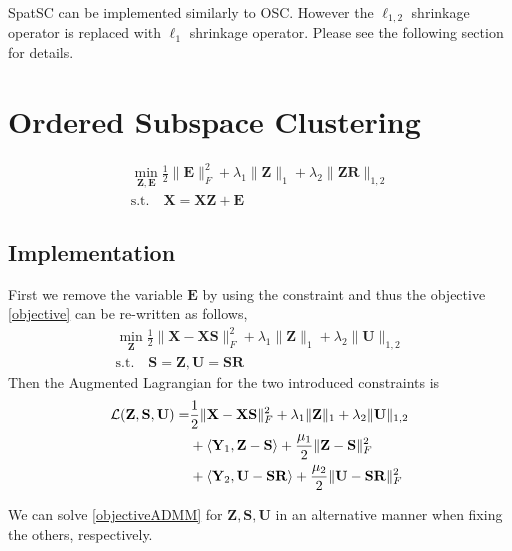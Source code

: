 \documentclass{article}
\begin{document}
SpatSC can be implemented similarly to OSC. However the $\ell_{1,2}$ shrinkage operator is replaced with $\ell_1$ shrinkage operator. Please see the following section for details.

\newpage
\section{Ordered Subspace Clustering}

\begin{align}
\label{objective}
\min_{\mathbf Z, \mathbf E} \frac12\|\mathbf E \|^2_F +\lambda_1\|\mathbf Z\|_{1}+\lambda_2\|\mathbf Z\mathbf R\|_{1,2} \\
\text{s.t.} \quad \mathbf{X = XZ + E} \nonumber
\end{align}

\subsection{Implementation}

First we remove the variable $\mathbf E$ by using the constraint and thus the objective \eqref{objective} can be re-written as follows,
\begin{align}
\label{objective_relaxed}
\min_{\mathbf Z} \frac12\|\mathbf X - \mathbf X\mathbf S\|^2_F +\lambda_1\|\mathbf Z\|_{1}+\lambda_2\|\mathbf U \|_{1,2}\\
\text{s.t.} \quad \mathbf{S = Z, U = SR} \nonumber
\end{align}
Then the Augmented Lagrangian for the two introduced constraints is
\begin{align}
\mathcal{L}(\mathbf Z, \mathbf S, \mathbf U) = & \frac12\|\mathbf X - \mathbf X\mathbf S\|^2_F + \lambda_1 \|\mathbf Z\|_{1} + \lambda_2\|\mathbf U\|_{1,2} \notag\\
& + \langle \mathbf Y_1, \mathbf Z - \mathbf S\rangle +\frac{\mu_1}2\|\mathbf Z - \mathbf S\|^2_F \notag\\
& + \langle \mathbf Y_2, \mathbf U - \mathbf S\mathbf R\rangle +\frac{\mu_2}2\|\mathbf U - \mathbf S\mathbf R\|^2_F
\label{objectiveADMM}
\end{align}

We can solve \eqref{objectiveADMM} for $\mathbf Z, \mathbf S, \mathbf U$ in an alternative manner when fixing the others, respectively.
\end{document}
